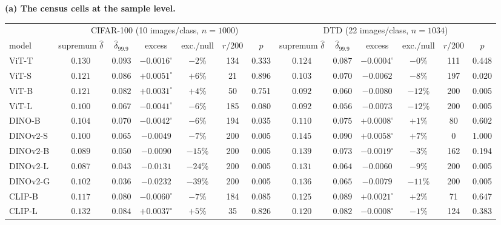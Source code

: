 \begin{table}[H]
\centering
\scriptsize
\setlength{\tabcolsep}{2.4pt}
\noindent\textbf{(a) The census cells at the sample level.}\par\vspace{1.5pt}
\begin{tabular}{lcccccc|cccccc}
\toprule
& \multicolumn{6}{c|}{CIFAR-100 (10 images/class, $n{=}1000$)} & \multicolumn{6}{c}{DTD (22 images/class, $n{=}1034$)} \\
model & supremum $\hat\delta$ & $\hat\delta_{99.9}$ & excess & exc./null & $r$/200 & $p$ & supremum $\hat\delta$ & $\hat\delta_{99.9}$ & excess & exc./null & $r$/200 & $p$ \\
\midrule
ViT-T & $0.130$ & $0.093$ & $-0.0016^{\circ}$ & $-2\%$ & 134 & 0.333 & $0.124$ & $0.087$ & $-0.0004^{\circ}$ & $-0\%$ & 111 & 0.448 \\
ViT-S & $0.121$ & $0.086$ & $+0.0051^{\circ}$ & $+6\%$ & 21 & 0.896 & $0.103$ & $0.070$ & $-0.0062$ & $-8\%$ & 197 & 0.020 \\
ViT-B & $0.121$ & $0.082$ & $+0.0031^{\circ}$ & $+4\%$ & 50 & 0.751 & $0.092$ & $0.060$ & $-0.0080$ & $-12\%$ & 200 & 0.005 \\
ViT-L & $0.100$ & $0.067$ & $-0.0041^{\circ}$ & $-6\%$ & 185 & 0.080 & $0.092$ & $0.056$ & $-0.0073$ & $-12\%$ & 200 & 0.005 \\
\midrule
DINO-B & $0.104$ & $0.070$ & $-0.0042^{\circ}$ & $-6\%$ & 194 & 0.035 & $0.110$ & $0.075$ & $+0.0008^{\circ}$ & $+1\%$ & 80 & 0.602 \\
DINOv2-S & $0.100$ & $0.065$ & $-0.0049$ & $-7\%$ & 200 & 0.005 & $0.145$ & $0.090$ & $+0.0058^{\circ}$ & $+7\%$ & 0 & 1.000 \\
DINOv2-B & $0.089$ & $0.050$ & $-0.0090$ & $-15\%$ & 200 & 0.005 & $0.139$ & $0.073$ & $-0.0019^{\circ}$ & $-3\%$ & 162 & 0.194 \\
DINOv2-L & $0.087$ & $0.043$ & $-0.0131$ & $-24\%$ & 200 & 0.005 & $0.131$ & $0.064$ & $-0.0060$ & $-9\%$ & 200 & 0.005 \\
DINOv2-G & $0.102$ & $0.036$ & $-0.0232$ & $-39\%$ & 200 & 0.005 & $0.136$ & $0.065$ & $-0.0079$ & $-11\%$ & 200 & 0.005 \\
\midrule
CLIP-B & $0.117$ & $0.080$ & $-0.0060^{\circ}$ & $-7\%$ & 184 & 0.085 & $0.125$ & $0.089$ & $+0.0021^{\circ}$ & $+2\%$ & 71 & 0.647 \\
CLIP-L & $0.132$ & $0.084$ & $+0.0037^{\circ}$ & $+5\%$ & 35 & 0.826 & $0.120$ & $0.082$ & $-0.0008^{\circ}$ & $-1\%$ & 124 & 0.383 \\

\end{tabular}
\end{table}
